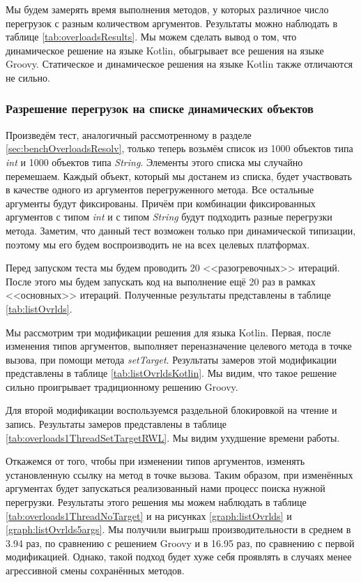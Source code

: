 Мы будем замерять время выполнения методов, у которых различное число перегрузок с разным количеством аргументов. Результаты можно наблюдать в таблице  \ref{tab:overloadsResults}. Мы можем сделать вывод о том, что динамическое решение на языке Kotlin, обыгрывает все решения на языке Groovy. Статическое и динамическое решения на языке Kotlin также отличаются не сильно.

\subsubsection{Разрешение перегрузок на списке динамических объектов}
\label{sec:listDynObjects}

Произведём тест, аналогичный рассмотренному в разделе \ref{sec:benchOverloadsResolv}, только теперь возьмём список из 1000 объектов типа \textit{int} и 1000 объектов типа \textit{String}. Элементы этого списка мы случайно перемешаем. Каждый объект, который мы достанем из списка, будет участвовать в качестве одного из аргументов перегруженного метода. Все остальные аргументы будут фиксированы. Причём при комбинации фиксированных аргументов с типом \textit{int} и с типом \textit{String} будут подходить разные перегрузки метода. Заметим, что данный тест возможен только при динамической типизации, поэтому мы его будем воспроизводить не на всех целевых платформах.

Перед запуском теста мы будем проводить 20 <<разогревочных>> итераций. После этого мы будем запускать код на выполнение ещё 20 раз в рамках <<основных>> итераций. Полученные результаты представлены в таблице \ref{tab:listOvrlds}.

Мы рассмотрим три модификации решения для языка Kotlin. Первая, после изменения типов аргументов, выполняет переназначение целевого метода в точке вызова, при помощи метода \textit{setTarget}. Результаты замеров этой модификации представлены в таблице \ref{tab:listOvrldsKotlin}. Мы видим, что такое решение сильно проигрывает традиционному решению Groovy. 

Для второй модификации воспользуемся раздельной блокировкой на чтение и запись\footnotemark. Результаты замеров представлены в таблице \ref{tab:overloads1ThreadSetTargetRWL}. Мы видим ухудшение времени работы.



Откажемся от того, чтобы при изменении типов аргументов, изменять установленную ссылку на метод в точке вызова. Таким образом, при изменённых аргументах будет запускаться реализованный нами процесс поиска нужной перегрузки.
Результаты этого решения мы можем наблюдать в таблице  \ref{tab:overloads1ThreadNoTarget} и на рисунках \ref{graph:listOvrlds} и \ref{graph:listOvrlds5args}. Мы получили выигрыш производительности в среднем в 3.94 раз, по сравнению с решением Groovy и в 16.95 раз, по сравнению с первой модификацией. Однако, такой подход будет хуже себя проявлять в случаях менее агрессивной смены сохранённых методов.

